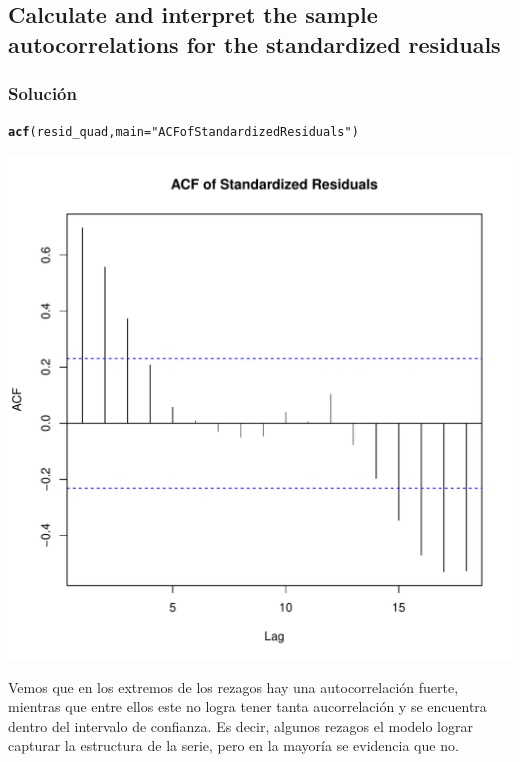 \documentclass[12pt]{article}\usepackage[]{graphicx}\usepackage[]{xcolor}
\makeatletter
\def\maxwidth{ %
  \ifdim\Gin@nat@width>\linewidth
    \linewidth
  \else
    \Gin@nat@width
  \fi
}
\newcommand{\hlsng}[1]{\textcolor[rgb]{0.192,0.494,0.8}{#1}}%
\newcommand{\hldef}[1]{\textcolor[rgb]{0.345,0.345,0.345}{#1}}%
\newcommand{\hlkwc}[1]{\textcolor[rgb]{0.333,0.667,0.333}{#1}}%
\newcommand{\hlkwd}[1]{\textcolor[rgb]{0.737,0.353,0.396}{\textbf{#1}}}%
\newenvironment{kframe}{%
 \def\at@end@of@kframe{}%
 \ifinner\ifhmode%
  \def\at@end@of@kframe{\end{minipage}}%
  \begin{minipage}{\columnwidth}%
 \fi\fi%
 \def\FrameCommand##1{\hskip\@totalleftmargin \hskip-\fboxsep
 \colorbox{shadecolor}{##1}\hskip-\fboxsep
     \hskip-\linewidth \hskip-\@totalleftmargin \hskip\columnwidth}%
 \MakeFramed {\advance\hsize-\width
   \@totalleftmargin\z@ \linewidth\hsize
   \@setminipage}}%
 {\par\unskip\endMakeFramed%
 \at@end@of@kframe}
\newenvironment{knitrout}{}{} %
\makeatother
\begin{document}
\subsection{ Calculate and interpret the sample autocorrelations for the standardized residuals}


\subsubsection{Solución}


\begin{knitrout}
\color{fgcolor}\begin{kframe}
\begin{alltt}
\hlkwd{acf}\hldef{(resid_quad,} \hlkwc{main} \hldef{=} \hlsng{"ACF of Standardized Residuals"}\hldef{)}
\end{alltt}
\end{kframe}
\includegraphics[width=\maxwidth]{figure/unnamed-chunk-18-1} 
\end{knitrout}

Vemos que en los extremos de los rezagos hay una autocorrelación fuerte, mientras que entre ellos este no logra tener tanta aucorrelación y se encuentra dentro del intervalo de confianza. Es decir, algunos rezagos el modelo lograr capturar la estructura de la serie, pero en la mayoría se evidencia que no.
\end{document}
